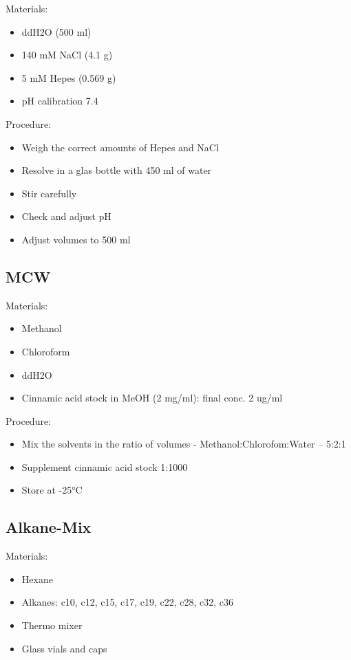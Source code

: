 \documentclass[]{book}
\providecommand{\tightlist}{%
  \setlength{\itemsep}{0pt}\setlength{\parskip}{0pt}}
\begin{document}
Materials:

\begin{itemize}
\tightlist
\item
  ddH2O (500 ml)
\item
  140 mM NaCl (4.1 g)
\item
  5 mM Hepes (0.569 g)
\item
  pH calibration 7.4
\end{itemize}

Procedure:

\begin{itemize}
\tightlist
\item
  Weigh the correct amounts of Hepes and NaCl
\item
  Resolve in a glas bottle with 450 ml of water
\item
  Stir carefully
\item
  Check and adjust pH
\item
  Adjust volumes to 500 ml
\end{itemize}

\subsection{MCW}\label{mcw}

Materials:

\begin{itemize}
\tightlist
\item
  Methanol
\item
  Chloroform
\item
  ddH2O
\item
  Cinnamic acid stock in MeOH (2 mg/ml): final conc. 2 ug/ml
\end{itemize}

Procedure:

\begin{itemize}
\tightlist
\item
  Mix the solvents in the ratio of volumes - Methanol:Chlorofom:Water --
  5:2:1
\item
  Supplement cinnamic acid stock 1:1000
\item
  Store at -25°C
\end{itemize}

\subsection{Alkane-Mix}\label{alkanemix}

Materials:

\begin{itemize}
\tightlist
\item
  Hexane
\item
  Alkanes: c10, c12, c15, c17, c19, c22, c28, c32, c36
\item
  Thermo mixer
\item
  Glass vials and caps
\end{itemize}
\end{document}
